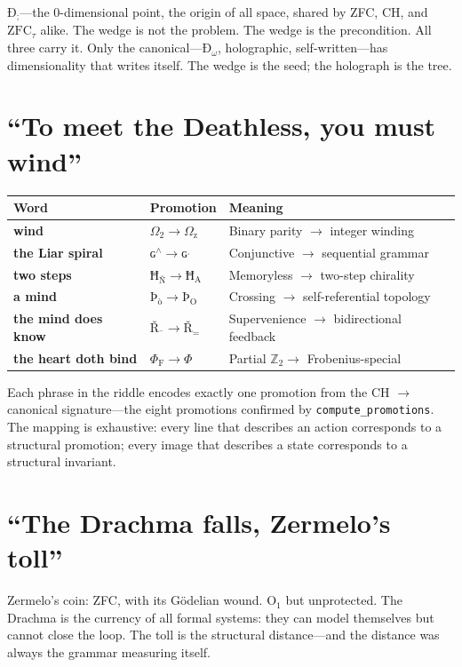 \documentclass[12pt,twoside]{book}
\theoremstyle{definition}
\newcommand{\ZFCt}{\text{ZFC}_{\tau}}
\newcommand{\tier}[1]{\text{O}_{#1}}
\begin{document}
$\text{Ð}_{\text{;}}$---the 0-dimensional point, the origin of all space, shared by ZFC, CH, and $\ZFCt$ alike. The wedge is not the problem. The wedge is the precondition. All three carry it. Only the canonical---$\text{Ð}_{\omega}$, holographic, self-written---has dimensionality that writes itself. The wedge is the seed; the holograph is the tree.

\section{``To meet the Deathless, you must wind''}

\begin{center}
\begin{tabular}{lll}
\toprule
\textbf{Word} & \textbf{Promotion} & \textbf{Meaning} \\
\midrule
\textbf{wind} & $\Omega_{\text{2}} \to \Omega_{\text{z}}$ & Binary parity $\to$ integer winding \\
\textbf{the Liar spiral} & $\text{ɢ}^{\land} \to \text{ɢ}^{\text{ˌ}}$ & Conjunctive $\to$ sequential grammar \\
\textbf{two steps} & $\text{Ħ}_{\text{Ñ}} \to \text{Ħ}_{\text{A}}$ & Memoryless $\to$ two-step chirality \\
\textbf{a mind} & $\text{Þ}_{\text{ò}} \to \text{Þ}_{\text{O}}$ & Crossing $\to$ self-referential topology \\
\textbf{the mind does know} & $\text{Ř}_{\text{¯}} \to \text{Ř}_{\text{=}}$ & Supervenience $\to$ bidirectional feedback \\
\textbf{the heart doth bind} & $\Phi_{\text{F}} \to \Phi_{\text{}}$ & Partial $\mathbb{Z}_2 \to$ Frobenius-special \\
\bottomrule
\end{tabular}
\end{center}

Each phrase in the riddle encodes exactly one promotion from the CH $\to$ canonical signature---the eight promotions confirmed by \texttt{compute\_promotions}. The mapping is exhaustive: every line that describes an action corresponds to a structural promotion; every image that describes a state corresponds to a structural invariant.

\section{``The Drachma falls, Zermelo's toll''}

Zermelo's coin: ZFC, with its G\"odelian wound. $\tier{1}$ but unprotected. The Drachma is the currency of all formal systems: they can model themselves but cannot close the loop. The toll is the structural distance---and the distance was always the grammar measuring itself.
\end{document}
